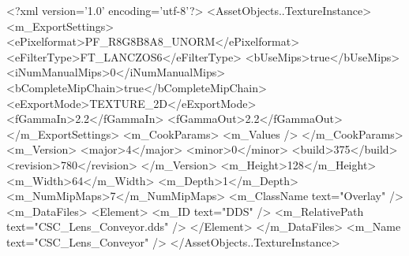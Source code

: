 <?xml version='1.0' encoding='utf-8'?>
<AssetObjects..TextureInstance>
  <m_ExportSettings>
    <ePixelformat>PF_R8G8B8A8_UNORM</ePixelformat>
    <eFilterType>FT_LANCZOS6</eFilterType>
    <bUseMips>true</bUseMips>
    <iNumManualMips>0</iNumManualMips>
    <bCompleteMipChain>true</bCompleteMipChain>
    <eExportMode>TEXTURE_2D</eExportMode>
    <fGammaIn>2.2</fGammaIn>
    <fGammaOut>2.2</fGammaOut>
  </m_ExportSettings>
  <m_CookParams>
    <m_Values />
  </m_CookParams>
  <m_Version>
    <major>4</major>
    <minor>0</minor>
    <build>375</build>
    <revision>780</revision>
  </m_Version>
  <m_Height>128</m_Height>
  <m_Width>64</m_Width>
  <m_Depth>1</m_Depth>
  <m_NumMipMaps>7</m_NumMipMaps>
  <m_ClassName text="Overlay" />
  <m_DataFiles>
    <Element>
      <m_ID text="DDS" />
      <m_RelativePath text="CSC_Lens_Conveyor.dds" />
    </Element>
  </m_DataFiles>
  <m_Name text="CSC_Lens_Conveyor" />
</AssetObjects..TextureInstance>

